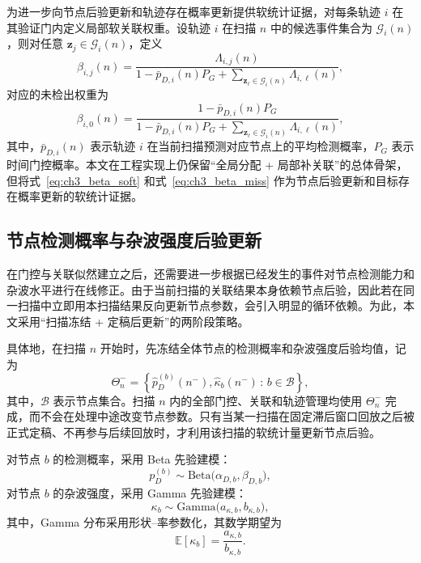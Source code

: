 \documentclass{xdupgthesis}
\begin{document}
为进一步向节点后验更新和轨迹存在概率更新提供软统计证据，对每条轨迹 $i$ 在其验证门内定义局部软关联权重。设轨迹 $i$ 在扫描 $n$ 中的候选事件集合为 $\mathcal G_i(n)$，则对任意 $\mathbf z_j\in\mathcal G_i(n)$，定义
\begin{equation}
	\beta_{i,j}(n)=
	\frac{
		\Lambda_{i,j}(n)
	}{
		1-\bar p_{D,i}(n)P_G
		+
		\sum_{\mathbf z_\ell\in\mathcal G_i(n)}\Lambda_{i,\ell}(n)
	},
	\label{eq:ch3_beta_soft}
\end{equation}
对应的未检出权重为
\begin{equation}
	\beta_{i,0}(n)=
	\frac{
		1-\bar p_{D,i}(n)P_G
	}{
		1-\bar p_{D,i}(n)P_G
		+
		\sum_{\mathbf z_\ell\in\mathcal G_i(n)}\Lambda_{i,\ell}(n)
	},
	\label{eq:ch3_beta_miss}
\end{equation}
其中，$\bar p_{D,i}(n)$ 表示轨迹 $i$ 在当前扫描预测对应节点上的平均检测概率，$P_G$ 表示时间门控概率。本文在工程实现上仍保留“全局分配 + 局部补关联”的总体骨架，但将式~\eqref{eq:ch3_beta_soft} 和式~\eqref{eq:ch3_beta_miss} 作为节点后验更新和目标存在概率更新的软统计证据。

\subsection{节点检测概率与杂波强度后验更新}
\label{subsec:ch3_node_stats}

在门控与关联似然建立之后，还需要进一步根据已经发生的事件对节点检测能力和杂波水平进行在线修正。由于当前扫描的关联结果本身依赖节点后验，因此若在同一扫描中立即用本扫描结果反向更新节点参数，会引入明显的循环依赖。为此，本文采用“扫描冻结 + 定稿后更新”的两阶段策略。

具体地，在扫描 $n$ 开始时，先冻结全体节点的检测概率和杂波强度后验均值，记为
\begin{equation}
	\Theta_n^{-}=
	\left\{
	\hat p_D^{(b)}(n^-),\hat\kappa_b(n^-)\,:\,b\in\mathcal B
	\right\},
	\label{eq:ch3_theta_frozen}
\end{equation}
其中，$\mathcal B$ 表示节点集合。扫描 $n$ 内的全部门控、关联和轨迹管理均使用 $\Theta_n^{-}$ 完成，而不会在处理中途改变节点参数。只有当某一扫描在固定滞后窗口回放之后被正式定稿、不再参与后续回放时，才利用该扫描的软统计量更新节点后验。

对节点 $b$ 的检测概率，采用 Beta 先验建模：
\begin{equation}
	p_D^{(b)}\sim \mathrm{Beta}\bigl(\alpha_{D,b},\beta_{D,b}\bigr),
	\label{eq:ch3_beta_prior}
\end{equation}
对节点 $b$ 的杂波强度，采用 Gamma 先验建模：
\begin{equation}
	\kappa_b\sim \mathrm{Gamma}\bigl(a_{\kappa,b},b_{\kappa,b}\bigr),
	\label{eq:ch3_gamma_prior}
\end{equation}
其中，Gamma 分布采用形状--率参数化，其数学期望为
\begin{equation}
	\mathbb E[\kappa_b]=\frac{a_{\kappa,b}}{b_{\kappa,b}}.
	\label{eq:ch3_kappa_mean}
\end{equation}
\end{document}
